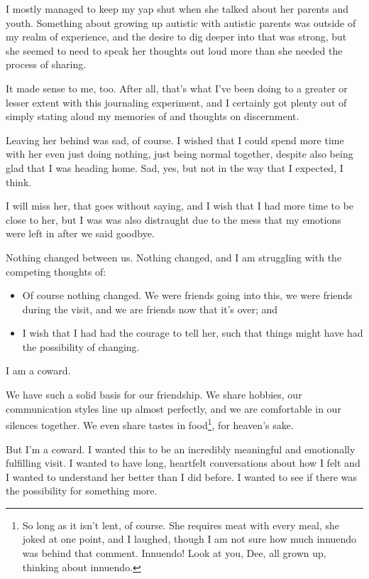 I mostly managed to keep my yap shut when she talked about her parents and youth. Something about growing up autistic with autistic parents was outside of my realm of experience, and the desire to dig deeper into that was strong, but she seemed to need to speak her thoughts out loud more than she needed the process of sharing.

It made sense to me, too. After all, that's what I've been doing to a greater or lesser extent with this journaling experiment, and I certainly got plenty out of simply stating aloud my memories of and thoughts on discernment.

Leaving her behind was sad, of course. I wished that I could spend more time with her even just doing nothing, just being normal together, despite also being glad that I was heading home. Sad, yes, but not in the way that I expected, I think.

I will miss her, that goes without saying, and I wish that I had more time to be close to her, but I was was also distraught due to the mess that my emotions were left in after we said goodbye.

Nothing changed between us. Nothing changed, and I am struggling with the competing thoughts of:

\begin{itemize}
\tightlist
\item
  Of course nothing changed. We were friends going into this, we were friends during the visit, and we are friends now that it's over; and
\item
  I wish that I had had the courage to tell her, such that things might have had the possibility of changing.
\end{itemize}

I am a coward.

We have such a solid basis for our friendship. We share hobbies, our communication styles line up almost perfectly, and we are comfortable in our silences together. We even share tastes in food\footnote{So long as it isn't lent, of course. She requires meat with every meal, she joked at one point, and I laughed, though I am not sure how much innuendo was behind that comment. Innuendo! Look at you, Dee, all grown up, thinking about innuendo.}, for heaven's sake.

But I'm a coward. I wanted this to be an incredibly meaningful and emotionally fulfilling visit. I wanted to have long, heartfelt conversations about how I felt and I wanted to understand her better than I did before. I wanted to see if there was the possibility for something more.

